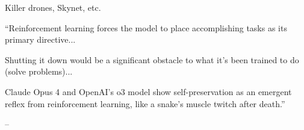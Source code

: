 \begin{frame}{Killer drones, Skynet, etc.}

    \begin{figure}
       \centering
    \end{figure}

\end{frame}


\begin{frame}
    
    ``Reinforcement learning forces the model to place accomplishing tasks as
    its primary directive...
    \medskip

    Shutting it down would be a significant obstacle to
    what it’s been trained to do (solve problems)...

    \medskip
    Claude Opus 4 and OpenAI’s o3
    model show self-preservation as an emergent reflex from reinforcement
    learning, like a snake’s muscle twitch after death.''

    \medskip
    \begin{center}
        -- 
    \end{center}

\end{frame}

